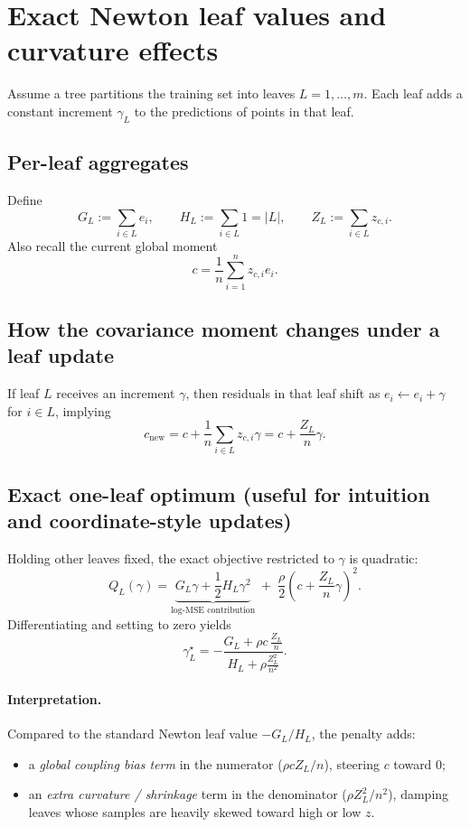 \documentclass[11pt]{article}
\theoremstyle{plain}
\theoremstyle{definition}
\newcommand{\1}{\mathbf{1}}
\begin{document}
{\section{Exact Newton leaf values and curvature effects}

Assume a tree partitions the training set into leaves \(L=1,\dots,m\). Each leaf adds a constant increment \(\gamma_L\) to the predictions of points in that leaf.

\subsection{Per-leaf aggregates}
Define
\[
G_L := \sum_{i\in L} e_i,
\qquad
H_L := \sum_{i\in L} 1 = |L|,
\qquad
Z_L := \sum_{i\in L} z_{c,i}.
\]
Also recall the current global moment
\[
c=\frac{1}{n}\sum_{i=1}^n z_{c,i}e_i.
\]

\subsection{How the covariance moment changes under a leaf update}
If leaf \(L\) receives an increment \(\gamma\), then residuals in that leaf shift as \(e_i\leftarrow e_i+\gamma\) for \(i\in L\), implying
\[
c_{\text{new}} = c + \frac{1}{n}\sum_{i\in L} z_{c,i}\gamma = c + \frac{Z_L}{n}\gamma.
\]

\subsection{Exact one-leaf optimum (useful for intuition and coordinate-style updates)}
Holding other leaves fixed, the exact objective restricted to \(\gamma\) is quadratic:
\[
Q_L(\gamma) =
\underbrace{G_L\gamma + \frac{1}{2}H_L\gamma^2}_{\text{log-MSE contribution}}
\;+\;
\frac{\rho}{2}\left(c + \frac{Z_L}{n}\gamma\right)^2.
\]
Differentiating and setting to zero yields
\[
\boxed{
\gamma_L^\star
=
-\frac{
G_L + \rho c\,\frac{Z_L}{n}
}{
H_L + \rho\frac{Z_L^2}{n^2}
}
}.
\]
\paragraph{Interpretation.}
Compared to the standard Newton leaf value \(-G_L/H_L\), the penalty adds:
\begin{itemize}[leftmargin=*]
\item a \emph{global coupling bias term} in the numerator (\(\rho c Z_L/n\)), steering \(c\) toward \(0\);
\item an \emph{extra curvature / shrinkage} term in the denominator (\(\rho Z_L^2/n^2\)), damping leaves whose samples are heavily skewed toward high or low \(z\).
\end{itemize}

}
\end{document}
